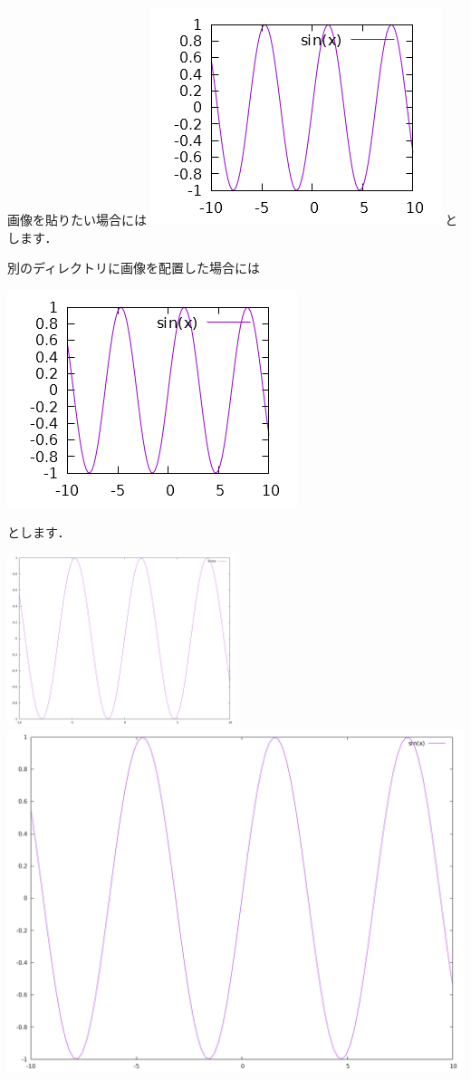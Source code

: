 \documentclass[lualatex]{jlreq}
\begin{document}
	画像を貼りたい場合には
	\includegraphics{sample1.png}
	とします．

	別のディレクトリに画像を配置した場合には
	\begin{center}
		\includegraphics{./picture/sample1.png}
	\end{center}
	とします．

	\includegraphics[height=50mm]{sample2.png}\\
	\includegraphics[width=0.7\columnwidth]{sample2.png}
\end{document}
